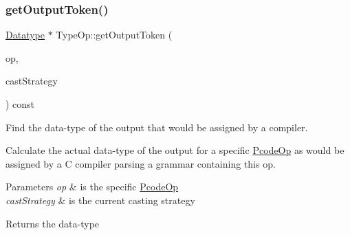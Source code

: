 \subsubsection{\texorpdfstring{getOutputToken()}{getOutputToken()}}
{\footnotesize\ttfamily \mbox{\hyperlink{class_datatype}{Datatype}} $\ast$ Type\+Op\+::get\+Output\+Token (\begin{DoxyParamCaption}\item[{const \mbox{\hyperlink{class_pcode_op}{Pcode\+Op}} $\ast$}]{op,  }\item[{\mbox{\hyperlink{class_cast_strategy}{Cast\+Strategy}} $\ast$}]{cast\+Strategy }\end{DoxyParamCaption}) const\hspace{0.3cm}{\ttfamily [virtual]}}



Find the data-\/type of the output that would be assigned by a compiler. 

Calculate the actual data-\/type of the output for a specific \mbox{\hyperlink{class_pcode_op}{Pcode\+Op}} as would be assigned by a C compiler parsing a grammar containing this op. 
\begin{DoxyParams}{Parameters}
{\em op} & is the specific \mbox{\hyperlink{class_pcode_op}{Pcode\+Op}} \\
\hline
{\em cast\+Strategy} & is the current casting strategy \\
\hline
\end{DoxyParams}
\begin{DoxyReturn}{Returns}
the data-\/type 
\end{DoxyReturn}


